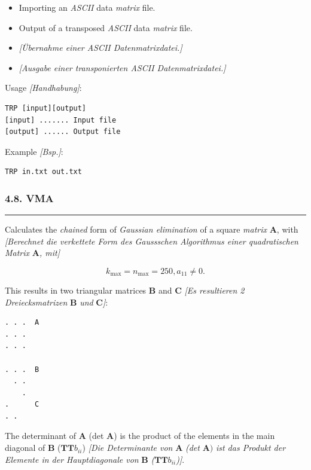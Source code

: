 \documentclass[
]{article}
\begin{document}
\begin{itemize}
\item
  Importing an \emph{ASCII} data \emph{matrix} file.
\item
  Output of a transposed \emph{ASCII} data \emph{matrix} file.
\item
  \emph{{[}Übernahme einer ASCII Datenmatrixdatei.{]}}
\item
  \emph{{[}Ausgabe einer transponierten ASCII Datenmatrixdatei.{]}}
\end{itemize}

Usage \emph{{[}Handhabung{]}}:

\begin{verbatim}
TRP [input][output] 
[input] ....... Input file 
[output] ...... Output file
\end{verbatim}

Example \emph{{[}Bsp.{]}}:

\begin{verbatim}
TRP in.txt out.txt
\end{verbatim}

\hypertarget{vma}{%
\subsubsection{4.8. VMA}\label{vma}}

\begin{center}\rule{0.5\linewidth}{0.5pt}\end{center}

Calculates the \emph{chained} form of \emph{Gaussian elimination} of a
square \emph{matrix} \(\mathbf{A}\), with \emph{{[}Berechnet die
verkettete Form des Gaussschen Algorithmus einer quadratischen Matrix}
\(\mathbf{A}\)\emph{, mit{]}}

\[k_{\max} = n_{\max} = 250,a_{11} \neq 0.\]

This results in two triangular matrices \(\mathbf{B}\) and
\(\mathbf{C}\) \emph{{[}Es resultieren 2 Dreiecksmatrizen}
\(\mathbf{B}\) \emph{und} \(\mathbf{C}\)\emph{{]}}:

\begin{verbatim}
. . .  A
. . .  
. . .

. . .  B
  . .
    .
.      C
. .
\end{verbatim}

The determinant of \(\mathbf{A}\) (det \(\mathbf{A}\)) is the product of
the elements in the main diagonal of \(\mathbf{B}\)
(\(\mathbf{TT}b_{ii}\)) \emph{{[}Die Determinante von} \(\mathbf{A}\)
\emph{(det} \(\mathbf{A})\) \emph{ist das Produkt der Elemente in der
Hauptdiagonale von} \(\mathbf{B}\)
\emph{(}\(\mathbf{TT}b_{ii}\)\emph{){]}}.
\end{document}

